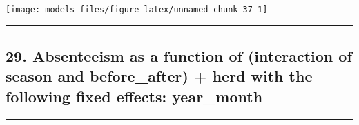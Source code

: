 \documentclass[]{article}
\begin{document}
\begin{center}\texttt{[image: models\_files/figure-latex/unnamed-chunk-37-1]} \end{center}

\newpage

\begin{center}\rule{0.5\linewidth}{\linethickness}\end{center}

\subsection{29. Absenteeism as a function of (interaction of season and
before\_after) + herd with the following fixed effects:
year\_month}\label{absenteeism-as-a-function-of-interaction-of-season-and-before_after-herd-with-the-following-fixed-effects-year_month}

\begin{center}\rule{0.5\linewidth}{\linethickness}\end{center}
\end{document}
